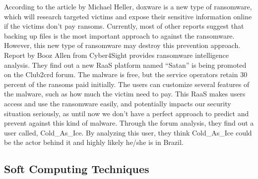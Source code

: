 \documentclass[11pt]{article}
\begin{document}
	According to the article by Michael Heller, doxware is a new type of ransomware, which will research targeted victims and expose their sensitive information online if the victims don’t pay ransoms. Currently, most of other reports suggest that backing up files is the most important approach to against the ransomware. However, this new type of ransomware may destroy this prevention approach. 
	Report by Booz Allen from Cyber4Sight provides ransomware intelligence analysis. They find out a new RaaS platform named “Satan” is being promoted on the Club2crd forum. The malware is free, but the service operators retain 30 percent of the ransoms paid initially. The users can customize several features of the malware, such as how much the victim need to pay. This RaaS makes users access and use the ransomware easily, and potentially impacts our security situation seriously, as until now we don’t have a perfect approach to predict and prevent against this kind of malware. Through the forum analysis, they find out a user called, Cold\_As\_Ice. By analyzing this user, they think Cold\_As\_Ice could be the actor behind it and highly likely he/she is in Brazil. 
	
	\subsection{Soft Computing Techniques}	
	
\end{document}
